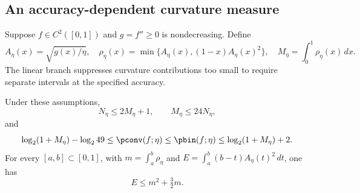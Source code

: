 \subsection{An accuracy-dependent curvature measure}

Suppose $f\in C^2([0,1])$ and $g=f''\ge0$ is nondecreasing. Define
\begin{equation}\label{eq:curvature-density}
 A_\eta(x)=\sqrt{g(x)/\eta},\quad
 \rho_\eta(x)=\min\{A_\eta(x),(1-x)A_\eta(x)^2\},\quad
 M_\eta=\int_0^1\rho_\eta(x)\,dx.
\end{equation}
The linear branch suppresses curvature contributions too small to
require separate intervals at the specified accuracy.

\begin{theorem}\label{thm:curvature-mass}
Under these assumptions,
\begin{equation}\label{eq:mass-chord-law}
 N_\eta\le2M_\eta+1,\qquad M_\eta\le24N_\eta,
\end{equation}
and
\begin{equation}\label{eq:mass-dimension-law}
 \log_2(1+M_\eta)-\log_2 49\le\pconv(f;\eta)
 \le\pbin(f;\eta)\le\log_2(1+M_\eta)+2.
\end{equation}
For every $[a,b]\subset[0,1]$, with
$m=\int_a^b\rho_\eta$ and
$E=\int_a^b(b-t)A_\eta(t)^2\,dt$, one has
\begin{equation}\label{eq:mass-local-remainder}
 E\le m^2+\tfrac32m.
\end{equation}
\end{theorem}
